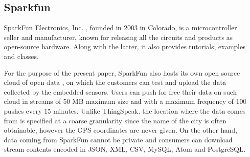 \subsection{Sparkfun}
SparkFun Electronics, Inc. \cite{sparkfun}, founded in 2003 in Colorado, is a microcontroller seller and manufacturer, known for releasing all the circuits and products as open-source hardware. \color{red} Along with the latter, it also provides\color{black} tutorials, examples and classes.

For the purpose of the present paper, SparkFun also hosts its own open source cloud of open data \cite{sparkfundata}, on which the customers can test and upload the data collected by the embedded sensors.
Users can push for free their data on such cloud in streams of 50 MB maximum size and with a maximum frequency of 100 pushes every 15 minutes.
Unlike ThingSpeak, the location where the data comes from is specified at a coarse granularity since the name of the city is often obtainable, however the GPS coordinates are never given.
On the other hand, data coming from SparkFun cannot be private and consumers can download stream contents encoded in JSON, XML, CSV, MySQL, Atom and PostgreSQL.